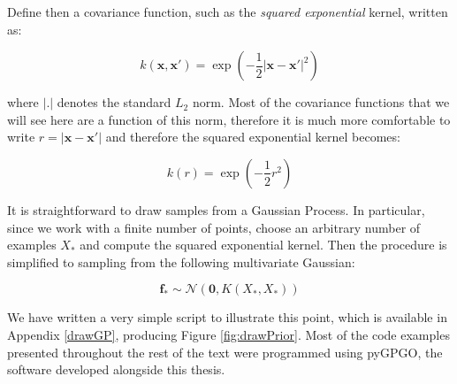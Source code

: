 \documentclass[10pt,a4paper,twoside]{book}
\begin{document}
%

Define then a covariance function, such as the \textit{squared exponential} kernel, written as:

\begin{equation}
k(\boldsymbol{x}, \boldsymbol{x}') = \exp\left(-\dfrac{1}{2}|\boldsymbol{x} - \boldsymbol{x}'|^2\right)
\end{equation}

where $|.|$ denotes the standard $L_2$ norm. Most of the covariance functions that we will see here are a function of this norm, therefore it is much more comfortable to write $r = |\boldsymbol{x} - \boldsymbol{x}'|$ and therefore the squared exponential kernel becomes:

\begin{equation}
\label{sqexp}
k(r) = \exp\left(-\dfrac{1}{2}r^2\right)
\end{equation}

It is straightforward to draw samples from a Gaussian Process. In particular, since we work with a finite number of points, choose an arbitrary number of examples $X_*$ and compute the squared exponential kernel. Then the procedure is simplified to sampling from the following multivariate Gaussian:

\begin{equation}
\label{fprior}
\boldsymbol{f_*} \sim \mathcal{N}\left(\boldsymbol{0}, K(X_*, X_*)\right)
\end{equation}


We have written a very simple script to illustrate this point, which is available in Appendix \ref{drawGP}, producing Figure \ref{fig:drawPrior}. Most of the code examples presented throughout the rest of the text were programmed using pyGPGO, the software developed alongside this thesis.\\
\end{document}
